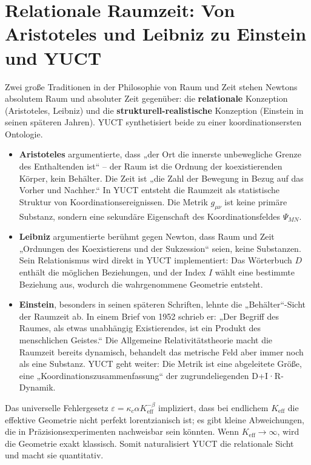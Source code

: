\documentclass[12pt,a4paper]{article}
\begin{document}
	\section{Relationale Raumzeit: Von Aristoteles und Leibniz zu Einstein und YUCT}
	
	Zwei große Traditionen in der Philosophie von Raum und Zeit stehen Newtons absolutem Raum und absoluter Zeit gegenüber: die \textbf{relationale} Konzeption (Aristoteles, Leibniz) und die \textbf{strukturell-realistische} Konzeption (Einstein in seinen späteren Jahren). YUCT synthetisiert beide zu einer koordinationsersten Ontologie.
	
	\begin{itemize}
		\item \textbf{Aristoteles} argumentierte, dass „der Ort die innerste unbewegliche Grenze des Enthaltenden ist“ – der Raum ist die Ordnung der koexistierenden Körper, kein Behälter. Die Zeit ist „die Zahl der Bewegung in Bezug auf das Vorher und Nachher.“ In YUCT entsteht die Raumzeit als statistische Struktur von Koordinationsereignissen. Die Metrik \(g_{\mu\nu}\) ist keine primäre Substanz, sondern eine sekundäre Eigenschaft des Koordinationsfeldes \(\Psi_{MN}\).
		
		\item \textbf{Leibniz} argumentierte berühmt gegen Newton, dass Raum und Zeit „Ordnungen des Koexistierens und der Sukzession“ seien, keine Substanzen. Sein Relationismus wird direkt in YUCT implementiert: Das Wörterbuch \(D\) enthält die möglichen Beziehungen, und der Index \(I\) wählt eine bestimmte Beziehung aus, wodurch die wahrgenommene Geometrie entsteht.
		
		\item \textbf{Einstein}, besonders in seinen späteren Schriften, lehnte die „Behälter“-Sicht der Raumzeit ab. In einem Brief von 1952 schrieb er: „Der Begriff des Raumes, als etwas unabhängig Existierendes, ist ein Produkt des menschlichen Geistes.“ Die Allgemeine Relativitätstheorie macht die Raumzeit bereits dynamisch, behandelt das metrische Feld aber immer noch als eine Substanz. YUCT geht weiter: Die Metrik ist eine abgeleitete Größe, eine „Koordinationszusammenfassung“ der zugrundeliegenden D+I·R-Dynamik.
	\end{itemize}
	
	Das universelle Fehlergesetz \(\varepsilon = \kappa_c \alpha K_{\mathrm{eff}}^{-\beta}\) impliziert, dass bei endlichem \(K_{\mathrm{eff}}\) die effektive Geometrie nicht perfekt lorentzianisch ist; es gibt kleine Abweichungen, die in Präzisionsexperimenten nachweisbar sein könnten. Wenn \(K_{\mathrm{eff}} \to \infty\), wird die Geometrie exakt klassisch. Somit naturalisiert YUCT die relationale Sicht und macht sie quantitativ.
	
\end{document}

